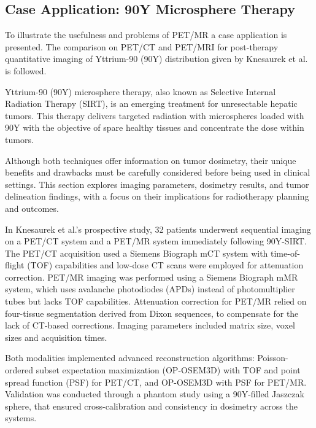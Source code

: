 \documentclass[11pt]{article} %
\begin{document}
\begin{multicols}{2}
	
	

\section{Case Application: 90Y Microsphere Therapy}

To illustrate the usefulness and problems of PET/MR a case application is presented. The comparison on PET/CT and PET/MRI for post-therapy quantitative imaging of Yttrium-90 (90Y) distribution given by Knesaurek et al. \cite{knesaurek2018} is followed.

Yttrium-90 (90Y) microsphere therapy, also known as Selective Internal Radiation Therapy (SIRT), is an emerging treatment for unresectable hepatic tumors. This therapy delivers targeted radiation with microspheres loaded with 90Y with the objective of spare healthy tissues and concentrate the dose within tumors.

Although both techniques offer information on tumor dosimetry, their unique benefits and drawbacks must be carefully considered before being used in clinical settings. This section explores imaging parameters, dosimetry results, and tumor delineation findings, with a focus on their implications for radiotherapy planning and outcomes.

In Knesaurek et al.’s prospective study, 32 patients underwent sequential imaging on a PET/CT system and a PET/MR system immediately following 90Y-SIRT. The PET/CT acquisition used a Siemens Biograph mCT system with time-of-flight (TOF) capabilities and low-dose CT scans were employed for attenuation correction. PET/MR imaging was performed using a Siemens Biograph mMR system, which uses avalanche photodiodes (APDs) instead of photomultiplier tubes but lacks TOF capabilities. Attenuation correction for PET/MR relied on four-tissue segmentation derived from Dixon sequences, to compensate for the lack of CT-based corrections. Imaging parameters included matrix size, voxel sizes and acquisition times. %

Both modalities implemented advanced reconstruction algorithms: Poisson-ordered subset expectation maximization (OP-OSEM3D) with TOF and point spread function (PSF) for PET/CT, and OP-OSEM3D with PSF for PET/MR. Validation was conducted through a phantom study using a 90Y-filled Jaszczak sphere, that ensured cross-calibration and consistency in dosimetry across the systems.


\end{multicols}
\end{document}
